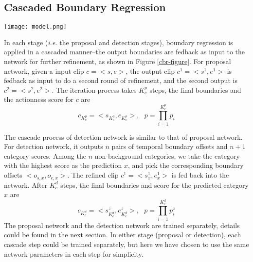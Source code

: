 \documentclass{bmvc2k}
\begin{document}
\subsection{Cascaded Boundary Regression}
\begin{figure*}[h]
\centering
\texttt{[image: model.png]}
\caption{ Unrolled model of Cascaded Boundary Regression (CBR), the parameters of the MLPs are shared.}
\label{cbr-figure}
\end{figure*}

In each stage (\emph{i.e.} the proposal and detection stages), boundary regression is applied in a cascaded manner--the output boundaries are fedback as input to the network for further refinement, as shown in Figure \ref{cbr-figure}. For proposal network, given a input clip $c=<s,e>$, the output clip $c^1=<s^1,e^1>$ is fedback as input to do a second round of refinement, and the second output is $c^2=<s^2,e^2>$. The iteration process takes $K_{c}^p$ steps, the final boundaries and the actionness score for $c$ are 
\begin{equation}
c_{K_{c}^p}=<s_{K_{c}^p},e_{K_{c}^p}>, ~~~ p=\prod_{i=1}^{K_{c}^p} p_i
\end{equation}

The cascade process of detection network is similar to that of proposal network. For detection network, it outputs $n$ pairs of temporal boundary offsets and $n+1$ category scores. Among the $n$ non-background categories, we take the category with the highest score as the prediction $x$, and pick the corresponding boundary offsets $<o_{s,x},o_{e,x}>$. The refined clip $c^1=<s^1_x,e^1_x>$ is fed back into the network. After $K_c^d$ steps, the final boundaries and score for the predicted category $x$ are
\begin{equation}
c_{K_{c}^d}=<s_{K_{c}^d}^z,e_{K_{c}^d}^z>, ~~~ p=\prod_{i=1}^{K_{c}^d} p_i^z
\end{equation}
The proposal network and the detection network are trained separately, details could be found in the next section. In either stage (proposal or detection), each cascade step could be trained separately, but here we have chosen to use the same network parameters in each step for simplicity.
\end{document}
